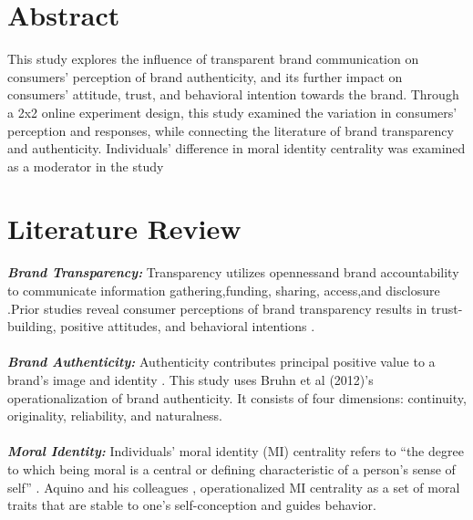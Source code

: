\documentclass[a0,portrait]{a0poster}
\begin{document}
\begin{minipage}[c]{\linewidth}
\begin{framed}
\begin{multicols}{2}
\section*{Abstract}
\color{Black}
This study explores the influence of transparent brand communication on consumers' perception of brand authenticity, and its further impact on consumers' attitude, trust, and behavioral intention towards the brand. Through a 2x2 online experiment design, this study examined the variation in consumers' perception and responses, while connecting the literature of brand transparency and authenticity. Individuals' difference in moral identity centrality was examined as a moderator in the study\\
\color{Maroon}
\section*{Literature Review}
\color{Black}
  \color{Maroon} \textbf{\emph{Brand Transparency:}} \color{Black}
Transparency utilizes openness\autocite{parris_exploring_2016}and brand accountability\autocite{yoo_brand_2014} to communicate information gathering,funding, sharing, access,and disclosure \autocite{phillips_online_2009}\autocite{wojdynski_measuring_2018} \autocite{yoo_brand_2014}\autocite{brandao_impact_2018}.Prior studies reveal consumer perceptions of brand transparency results in trust-building, positive attitudes, and behavioral intentions \autocite{reynolds_moral_2008}.\\
\\
  \color{Maroon} \textbf{\emph{Brand Authenticity:}} \color{Black} Authenticity contributes principal positive value to a brand's image \autocite{keller_strategic_1998}\autocite{ballantyne_evolution_2006}  and identity \autocite{beverland_crafting_2005}\autocite{kapferer_new_2008}. 
  This study uses Bruhn et al (2012)'s operationalization of brand authenticity. It consists of four dimensions: continuity, originality, reliability, and naturalness.
\\ 
\\
    \color{Maroon} \textbf{\emph{Moral Identity:}} \color{Black}Individuals’ moral identity (MI) centrality refers to “the degree to which being moral is a central or defining characteristic of a person’s sense of self” \autocite{blasi_moral_1994}.
    Aquino and his colleagues \autocite{aquino_self-importance_2002}\autocite{aquino_testing_2009}, operationalized MI centrality as a set of moral traits that are stable to one’s self-conception and guides behavior. 
    \\

\end{multicols}
\end{framed}
\end{minipage}
\end{document}
